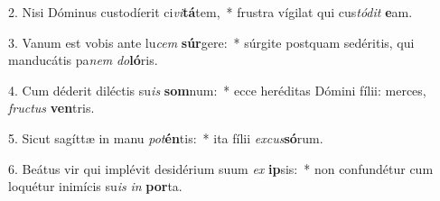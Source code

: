 2. Nisi Dóminus custodíerit ci\textit{vi}\textbf{tá}tem,~*  frustra vígilat qui cus\textit{tó}\textit{dit} \textbf{e}am.\

3. Vanum est vobis ante lu\textit{cem} \textbf{súr}gere:~*  súrgite postquam sedéritis, qui manducátis pa\textit{nem} \textit{do}\textbf{ló}ris.\

4. Cum déderit diléctis su\textit{is} \textbf{som}num:~*  ecce heréditas Dómini fílii: merces, \textit{fruc}\textit{tus} \textbf{ven}tris.\

5. Sicut sagíttæ in manu \textit{pot}\textbf{én}tis:~*  ita fílii \textit{ex}\textit{cus}\textbf{só}rum.\

6. Beátus vir qui implévit desidérium suum \textit{ex} \textbf{ip}sis:~*  non confundétur cum loquétur inimícis su\textit{is} \textit{in} \textbf{por}ta.\

